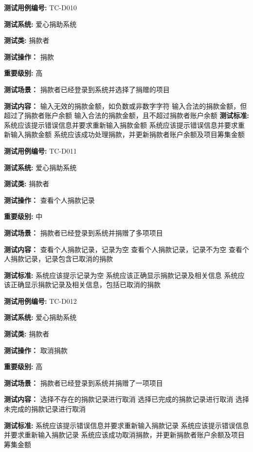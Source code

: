 \begin{framed} \textbf{测试用例编号:} TC-D010

\textbf{测试系统:} 爱心捐助系统

\textbf{测试类: } 捐款者

\textbf{测试操作：} 捐款

\textbf{重要级别:} 高

\textbf{测试场景：} 捐款者已经登录到系统并选择了捐赠的项目

\textbf{测试内容：} 输入无效的捐款金额，如负数或非数字字符 输入合法的捐款金额，但超过了捐款者账户余额 输入合法的捐款金额，且不超过捐款者账户余额
\textbf{测试标准:} 系统应该提示错误信息并要求重新输入捐款金额 系统应该提示错误信息并要求重新输入捐款金额 系统应该成功处理捐款，并更新捐款者账户余额及项目筹集金额

\begin{center}  \end{center} \end{framed}

\begin{framed} \textbf{测试用例编号:} TC-D011

\textbf{测试系统:} 爱心捐助系统

\textbf{测试类: } 捐款者

\textbf{测试操作：} 查看个人捐款记录

\textbf{重要级别:} 中

\textbf{测试场景：} 捐款者已经登录到系统并捐赠了多项项目

\textbf{测试内容：}  查看个人捐款记录，记录为空 查看个人捐款记录，记录不为空 查看个人捐款记录，记录包含已取消的捐款

\textbf{测试标准:} 系统应该提示记录为空 系统应该正确显示捐款记录及相关信息 系统应该正确显示捐款记录及相关信息，包括已取消的捐款

\begin{center}  \end{center} \end{framed}

\begin{framed} \textbf{测试用例编号:} TC-D012

\textbf{测试系统:} 爱心捐助系统

\textbf{测试类: } 捐款者

\textbf{测试操作：} 取消捐款

\textbf{重要级别:} 高

\textbf{测试场景：} 捐款者已经登录到系统并捐赠了一项项目

\textbf{测试内容：} 选择不存在的捐款记录进行取消 选择已完成的捐款记录进行取消 选择未完成的捐款记录进行取消

\textbf{测试标准:} 系统应该提示错误信息并要求重新输入捐款记录 系统应该提示错误信息并要求重新输入捐款记录 系统应该成功取消捐款，并更新捐款者账户余额及项目筹集金额

\begin{center}  \end{center} \end{framed}


